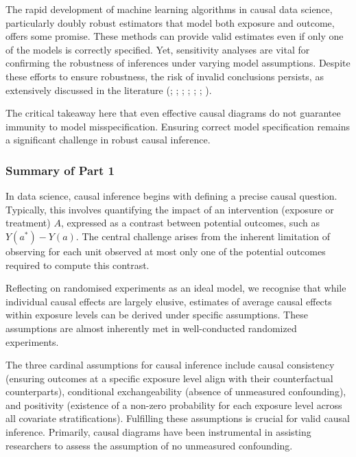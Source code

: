 \documentclass[
  singlecolumn,
  9pt]{article}
\begin{document}
The rapid development of machine learning algorithms in causal data
science, particularly doubly robust estimators that model both exposure
and outcome, offers some promise. These methods can provide valid
estimates even if only one of the models is correctly specified. Yet,
sensitivity analyses are vital for confirming the robustness of
inferences under varying model assumptions. Despite these efforts to
ensure robustness, the risk of invalid conclusions persists, as
extensively discussed in the literature (; ; ;
;
;
;
).

The critical takeaway here that even effective causal diagrams do not
guarantee immunity to model misspecification. Ensuring correct model
specification remains a significant challenge in robust causal
inference.

\subsubsection{Summary of Part 1}\label{summary-of-part-1}

In data science, causal inference begins with defining a precise causal
question. Typically, this involves quantifying the impact of an
intervention (exposure or treatment) \(A\), expressed as a contrast
between potential outcomes, such as \(Y(a^*) - Y(a)\). The central
challenge arises from the inherent limitation of observing for each unit
observed at most only one of the potential outcomes required to compute
this contrast.

Reflecting on randomised experiments as an ideal model, we recognise
that while individual causal effects are largely elusive, estimates of
average causal effects within exposure levels can be derived under
specific assumptions. These assumptions are almost inherently met in
well-conducted randomized experiments.

The three cardinal assumptions for causal inference include causal
consistency (ensuring outcomes at a specific exposure level align with
their counterfactual counterparts), conditional exchangeability (absence
of unmeasured confounding), and positivity (existence of a non-zero
probability for each exposure level across all covariate
stratifications). Fulfilling these assumptions is crucial for valid
causal inference. Primarily, causal diagrams have been instrumental in
assisting researchers to assess the assumption of no unmeasured
confounding.
\end{document}
